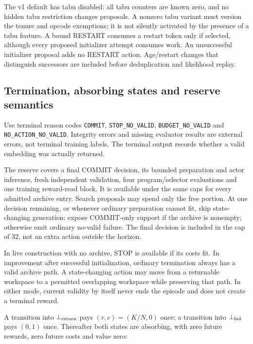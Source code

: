 \documentclass[10pt,a4paper]{article}
\begin{document}
The v1 default has tabu disabled: all tabu counters are known zero, and
no hidden tabu restriction changes proposals. A nonzero tabu variant
must version the tenure and opcode exemptions; it is not silently
activated by the presence of a tabu feature. A bound RESTART consumes a
restart token only if selected, although every proposed initializer
attempt consumes work. An unsuccessful initializer proposal adds no
RESTART action. Age/restart changes that distinguish successors are
included before deduplication and likelihood replay.

\hypertarget{termination-absorbing-states-and-reserve-semantics}{%
\subsection{Termination, absorbing states and reserve
semantics}\label{termination-absorbing-states-and-reserve-semantics}}

Use terminal reason codes \texttt{COMMIT}, \texttt{STOP\_NO\_VALID},
\texttt{BUDGET\_NO\_VALID} and \texttt{NO\_ACTION\_NO\_VALID}. Integrity
errors and missing evaluator results are external errors, not terminal
training labels. The terminal output records whether a valid embedding
was actually returned.

The reserve covers a final COMMIT decision, its bounded preparation and
actor inference, fresh independent validation, four program/selector
evaluations and one training reward-read block. It is available under
the same caps for every admitted archive entry. Search proposals may
spend only the free portion. At one decision remaining, or whenever
ordinary preparation cannot fit, skip state-changing generation: expose
COMMIT-only support if the archive is nonempty; otherwise emit ordinary
no-valid failure. The final decision is included in the cap of 32, not
an extra action outside the horizon.

In live construction with no archive, STOP is available if its costs
fit. In improvement after successful initialization, ordinary
termination always has a valid archive path. A state-changing action may
move from a returnable workspace to a permitted overlapping workspace
while preserving that path. In either mode, current validity by itself
never ends the episode and does not create a terminal reward.

A transition into \(\bot_{\rm return}\) pays \((r,c)=(K/N,0)\) once; a
transition into \(\bot_{\rm fail}\) pays \((0,1)\) once. Thereafter both
states are absorbing, with zero future rewards, zero future costs and
value zero:
\end{document}
